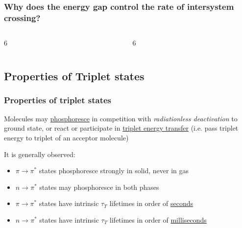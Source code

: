 \documentclass[ignorenonframetext]{beamer}
\begin{document}
\begin{frame}
\frametitle{Why does the energy gap control the rate of intersystem crossing?}
\begin{columns}[onlytextwidth]
\begin{column}{6\TPHorizModule}
\end{column}
\begin{column}{6\TPHorizModule}
\end{column}
\end{columns}
\end{frame}

\subsection{Properties of Triplet states}

\begin{frame}
\frametitle{Properties of triplet states}
Molecules may \underline{phosphoresce} in competition with \emph{radiationless deactivation} to ground state, or react or participate in \underline{triplet energy transfer} (i.e. pass triplet energy to triplet of an acceptor molecule)\newline\medskip

It is generally observed:\newline
\begin{itemize}
\item \(\pi \rightarrow \pi^*\) states phosphoresce strongly in solid, never in gas
\item \(n \rightarrow \pi^*\) states may phosphoresce in both phases
\item \(\pi \rightarrow \pi^*\) states have intrinsic \(\tau_T\) lifetimes in order of \underline{seconds}
\item \(n \rightarrow \pi^*\) states have intrinsic \(\tau_T\) lifetimes in order of \underline{milliseconds}
\end{itemize}
\end{frame}
\end{document}
